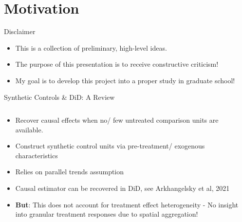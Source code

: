 \section{Motivation}
\begin{frame}{Disclaimer}
    \begin{itemize}
        \item{This is a collection of preliminary, high-level ideas.}
        \item{The purpose of this presentation is to receive constructive criticism!}
        \item{My goal is to develop this project into a proper study in graduate school!}
    \end{itemize}
\end{frame}

\begin{frame}{Synthetic Controls \& DiD: A Review}
  \begin{columns}
    \begin{column}{0.58\linewidth}
        \begin{itemize}
            \item{Recover causal effects when no/ few untreated comparison units are available.}
            \vspace{-7pt}
            \item{Construct synthetic control units via pre-treatment/ exogenous characteristics}
            \vspace{-7pt}
            \item{Relies on parallel trends assumption}
            \vspace{-7pt}
            \item{Causal estimator can be recovered in DiD, see Arkhangelsky et al, 2021}
            \vspace{-7pt}
            \item{\textbf{But}: This does not account for treatment effect heterogeneity - No insight into granular treatment responses due to spatial aggregation!}
        \end{itemize}
    \end{column}
    \begin{column}{0.5\linewidth}
        \centering

\end{column}
\end{columns}
\end{frame}
